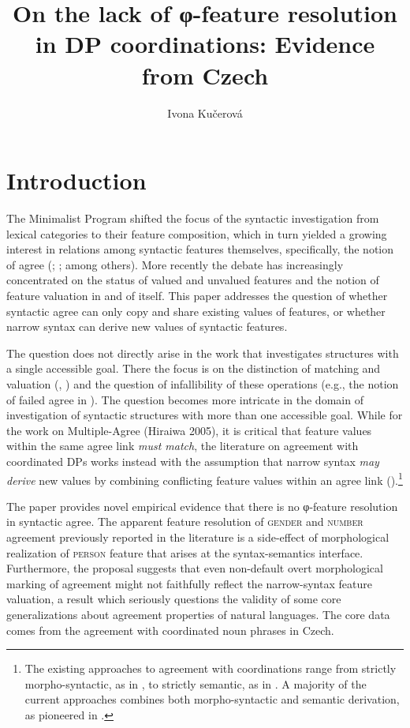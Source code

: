\documentclass[output=paper,
modfonts
newtxmath,
hidelinks
]{langscibook}
\title{On the lack of φ-feature resolution in DP coordinations: Evidence from Czech}
\author{%
 Ivona Kučerová\affiliation{McMaster University}
}
\begin{document}
\qtreecenterfalse
{}
\maketitle

\section{Introduction}

The Minimalist Program \citep{Chomsky1995} shifted the focus of the syntactic investigation from lexical categories to their feature composition, which in turn yielded a growing interest in relations among syntactic features themselves, specifically, the notion of agree (\citealt{chomsky2000}; \citealt{Chomsky2001}; among others). More recently the debate has increasingly concentrated on the status of valued and unvalued features \citep{pestorrego07} and the notion of feature valuation in and of itself. This paper addresses the question of whether syntactic agree can only copy and share existing values of features, or whether narrow syntax can derive new values of syntactic features.

The question does not directly arise in the work that investigates structures with a single accessible goal. There the focus is on the distinction of matching and valuation (\citealt{bejarrezac03}, \citealt{pestorrego07}) and the question of infallibility of these operations (e.g., the notion of failed agree in \citealt{Preminger2009}). The question becomes more intricate in the domain of investigation of syntactic structures with more than one accessible goal. While for the work on Multiple-Agree (Hiraiwa 2005), it is critical that feature values within the same agree link \emph{must match}, the literature on agreement with coordinated DPs works instead with the assumption that narrow syntax \emph{may derive} new values by combining conflicting feature values within an agree link (\citealt{Farkas1995,King2004,Heycock2005,Marusic2015}).\footnote{The existing approaches to agreement with coordinations range from strictly morpho-syntactic, as in \citet{Marusic2015}, to strictly semantic, as in \citet{Lasersohn1995}. A majority of the current approaches combines both morpho-syntactic and semantic derivation, as pioneered in \citet{Farkas1995}.}

The paper provides novel empirical evidence that there is no φ-feature resolution in syntactic agree. The apparent feature resolution of \textsc{gender} and \textsc{number} agreement previously reported in the literature is a side-effect of morphological realization of \textsc{person} feature that arises at the syntax-semantics interface. Furthermore, the proposal suggests that even non-default overt morphological marking of agreement might not faithfully reflect the narrow-syntax feature valuation, a result which seriously questions the validity of some core generalizations about agreement properties of natural languages. The core data comes from the agreement with coordinated noun phrases in Czech.
\end{document}
